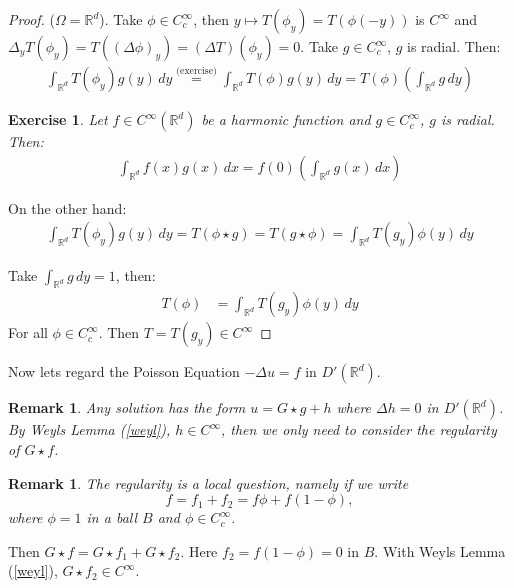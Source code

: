 \documentclass{report}
\theoremstyle{tommy}
\newtheorem{rem}[defn]{Remark}
\newtheorem{ex}[defn]{Exercise}
\begin{document}
  \begin{proof}
    (\(\Omega = \mathbb{R}^d\)). Take \(\phi \in C_c^\infty\), then \(y \mapsto T(\phi_y) = T(\phi(-y))\) is \(C^\infty\) and \(\Delta_y T(\phi_y) = T((\Delta \phi)_y) = (\Delta T)(\phi_y)=0\). Take \(g \in C_c^\infty\), \(g\) is radial. Then:
    \begin{align*}
      \int_{\mathbb{R}^d} T(\phi_y) g(y) \, dy 
      \overset{\text{(exercise)}}{=} \int_{\mathbb{R}^d} T(\phi)g(y) \, dy 
      = T(\phi) \left(\int_{\mathbb{R}^d} g \, dy \right)
    \end{align*}
  
  
    \begin{ex}
      Let \(f \in C^\infty(\mathbb{R}^d)\) be a harmonic function and \(g \in C_c^\infty\), \(g\) is radial. Then:
      \begin{align*}
        \int_{\mathbb{R}^d} f(x) g(x) \, dx = f(0) \left(\int_{\mathbb{R}^d} g(x) \, dx\right)
      \end{align*}
    \end{ex}

    On the other hand:
    \begin{align*}
      \int_{\mathbb{R}^d} T(\phi_y) g(y) \, dy = T(\phi \star g) = T(g \star \phi) = \int_{\mathbb{R}^d} T(g_y) \phi(y)\, dy
    \end{align*}

    Take \(\int_{\mathbb{R}^d} g \, dy = 1\), then:
    \begin{align*}
      T(\phi) 
      &= \int_{\mathbb{R}^d} T(g_y) \phi(y) \, dy 
    \end{align*}
    For all \(\phi \in C_c^\infty\). Then \(T = T(g_y) \in C^\infty\)
  \end{proof}

  Now lets regard the Poisson Equation \(- \Delta u = f\) in \(D'(\mathbb{R}^d)\).

  \begin{rem}
    Any solution has the form \(u = G \star g + h\) where \(\Delta h = 0\) in \(D'(\mathbb{R}^d)\). By Weyls Lemma (\ref{weyl}), \(h \in C^\infty\), then we only need to consider the regularity of \(G \star f\).
  \end{rem}

  \begin{rem}
    The regularity is a \emph{local question}, namely if we write \[f = f_1 + f_2 = f \phi + f(1-\phi),\] where \(\phi = 1\) in a ball \(B\) and \(\phi \in C_c^\infty\).
  \end{rem}
  Then \(G \star f = G \star f_1 + G \star f_2\). Here \(f_2 = f(1 - \phi) = 0\) in \(B\). With Weyls Lemma (\ref{weyl}), \(G \star f_2 \in C^\infty\).
\end{document}
